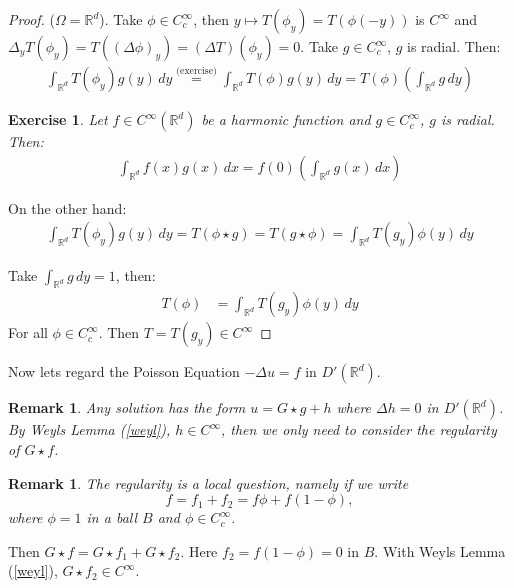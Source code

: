 \documentclass{report}
\theoremstyle{tommy}
\newtheorem{rem}[defn]{Remark}
\newtheorem{ex}[defn]{Exercise}
\begin{document}
  \begin{proof}
    (\(\Omega = \mathbb{R}^d\)). Take \(\phi \in C_c^\infty\), then \(y \mapsto T(\phi_y) = T(\phi(-y))\) is \(C^\infty\) and \(\Delta_y T(\phi_y) = T((\Delta \phi)_y) = (\Delta T)(\phi_y)=0\). Take \(g \in C_c^\infty\), \(g\) is radial. Then:
    \begin{align*}
      \int_{\mathbb{R}^d} T(\phi_y) g(y) \, dy 
      \overset{\text{(exercise)}}{=} \int_{\mathbb{R}^d} T(\phi)g(y) \, dy 
      = T(\phi) \left(\int_{\mathbb{R}^d} g \, dy \right)
    \end{align*}
  
  
    \begin{ex}
      Let \(f \in C^\infty(\mathbb{R}^d)\) be a harmonic function and \(g \in C_c^\infty\), \(g\) is radial. Then:
      \begin{align*}
        \int_{\mathbb{R}^d} f(x) g(x) \, dx = f(0) \left(\int_{\mathbb{R}^d} g(x) \, dx\right)
      \end{align*}
    \end{ex}

    On the other hand:
    \begin{align*}
      \int_{\mathbb{R}^d} T(\phi_y) g(y) \, dy = T(\phi \star g) = T(g \star \phi) = \int_{\mathbb{R}^d} T(g_y) \phi(y)\, dy
    \end{align*}

    Take \(\int_{\mathbb{R}^d} g \, dy = 1\), then:
    \begin{align*}
      T(\phi) 
      &= \int_{\mathbb{R}^d} T(g_y) \phi(y) \, dy 
    \end{align*}
    For all \(\phi \in C_c^\infty\). Then \(T = T(g_y) \in C^\infty\)
  \end{proof}

  Now lets regard the Poisson Equation \(- \Delta u = f\) in \(D'(\mathbb{R}^d)\).

  \begin{rem}
    Any solution has the form \(u = G \star g + h\) where \(\Delta h = 0\) in \(D'(\mathbb{R}^d)\). By Weyls Lemma (\ref{weyl}), \(h \in C^\infty\), then we only need to consider the regularity of \(G \star f\).
  \end{rem}

  \begin{rem}
    The regularity is a \emph{local question}, namely if we write \[f = f_1 + f_2 = f \phi + f(1-\phi),\] where \(\phi = 1\) in a ball \(B\) and \(\phi \in C_c^\infty\).
  \end{rem}
  Then \(G \star f = G \star f_1 + G \star f_2\). Here \(f_2 = f(1 - \phi) = 0\) in \(B\). With Weyls Lemma (\ref{weyl}), \(G \star f_2 \in C^\infty\).
\end{document}
